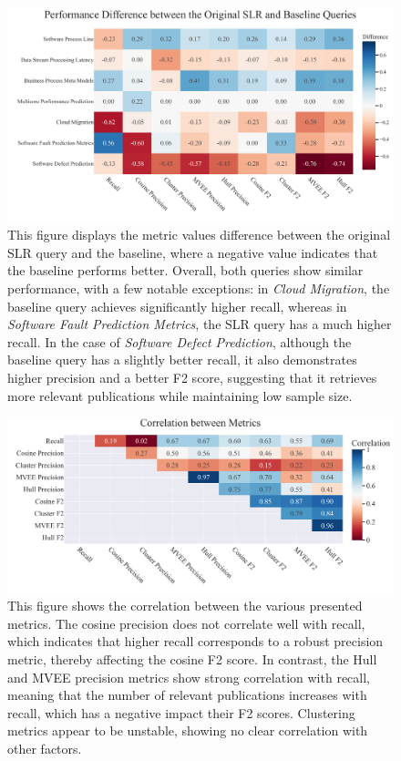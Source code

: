 \begin{figure}[!h]	
	\centering
	\includegraphics[scale=0.45]{pics/eval2_results.pdf}
	\caption[Evaluation Difference: Experiment 2]{This figure displays the metric values difference between the original SLR query and the baseline, where a negative value indicates that the baseline performs better. Overall, both queries show similar performance, with a few notable exceptions: in \textit{Cloud Migration}, the baseline query achieves significantly higher recall, whereas in \textit{Software Fault Prediction Metrics}, the SLR query has a much higher recall. In the case of \textit{Software Defect Prediction}, although the baseline query has a slightly better recall, it also demonstrates higher precision and a better F2 score, suggesting that it retrieves more relevant publications while maintaining low sample size.}
	\label{fig:eval2_results}
\end{figure}

\begin{figure}[!h]
	\centering
	\includegraphics[scale=0.4]{pics/metrics_correlation.pdf}
	\caption[Metrics Correlation]{This figure shows the correlation between the various presented metrics. The cosine precision does not correlate well with recall, which indicates that higher recall corresponds to a robust precision metric, thereby affecting the cosine F2 score. In contrast, the Hull and MVEE precision metrics show strong correlation with recall, meaning that the number of relevant publications increases with recall, which has a negative impact their F2 scores. Clustering metrics appear to be unstable, showing no clear correlation with other factors.}
	\label{fig:metrics-correlation}
\end{figure}


